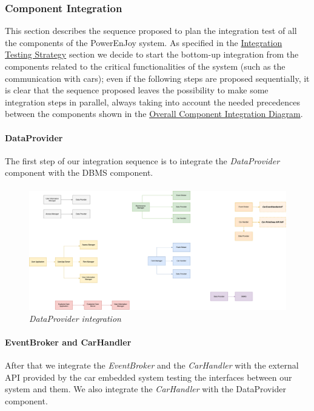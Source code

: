 \subsubsection{Component Integration}
This section describes the sequence proposed to plan the integration test of all the components of the PowerEnJoy system. As specified in the \hyperref[sec:intStrategy]{Integration Testing Strategy}  section  we decide to start the bottom-up integration from the components related to the critical functionalities of the system (such as the communication with cars); even if the following steps are proposed sequentially, it is clear that the sequence proposed leaves the possibility to make some integration steps in parallel, always taking into account the needed precedences between the components shown in the \hyperref[sec:overallPrecedences]{Overall Component Integration Diagram}.

\paragraph{DataProvider} 
The first step of our integration sequence is to integrate the \emph{DataProvider} component with the DBMS component.
\paragraph{}

		\begin{figure}[h]
			\centering
			\includegraphics[width=0.6\linewidth]{img/Integration1}
			\caption{
				\label{fig:dataProvider} 
				\emph{DataProvider integration}
			}
		\end{figure}

\paragraph{EventBroker and CarHandler} 
After that we integrate the \emph{EventBroker} and the \emph{CarHandler} with the external API provided by the car embedded system testing the interfaces between our system and them. We also integrate the \emph{CarHandler} with the {DataProvider} component.\\
